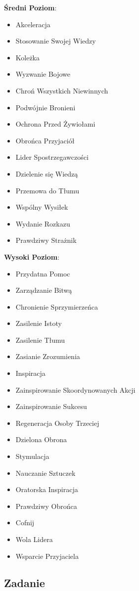 \textbf{Średni Poziom}:

\begin{itemize}
\item Akceleracja
\item Stosowanie Swojej Wiedzy
\item Koleżka
\item Wyzwanie Bojowe
\item Chroń Wszystkich Niewinnych
\item Podwójnie Bronieni
\item Ochrona Przed Żywiołami
\item Obrońca Przyjaciół
\item Lider Spostrzegawczości
\item Dzielenie się Wiedzą
\item Przemowa do Tłumu
\item Wspólny Wysiłek
\item Wydanie Rozkazu
\item Prawdziwy Strażnik
\end{itemize}

\textbf{Wysoki Poziom}:

\begin{itemize}
\item Przydatna Pomoc
\item Zarządzanie Bitwą
\item Chronienie Sprzymierzeńca
\item Zasilenie Istoty
\item Zasilenie Tłumu
\item Zasianie Zrozumienia
\item Inspiracja
\item Zainspirowanie Skoordynowanych Akcji
\item Zainspirowanie Sukcesu
\item Regeneracja Osoby Trzeciej
\item Dzielona Obrona
\item Stymulacja
\item Nauczanie Sztuczek
\item Oratorska Inspiracja
\item Prawdziwy Obrońca
\item Cofnij
\item Wola Lidera
\item Wsparcie Przyjaciela
\end{itemize}

\subsection{Zadanie}

